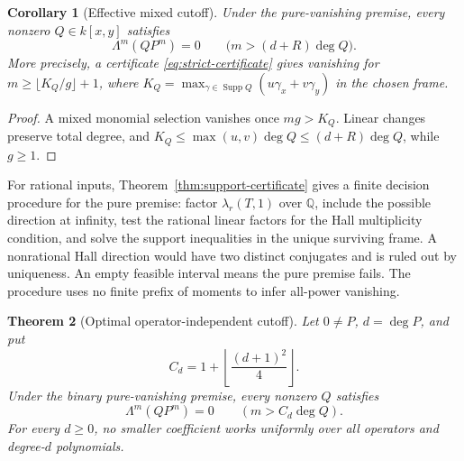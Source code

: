 \documentclass[11pt]{article}
\newtheorem{theorem}{Theorem}[section]
\newtheorem{corollary}[theorem]{Corollary}
\newcommand{\Q}{\mathbb Q}
\newcommand{\Supp}{\operatorname{Supp}}
\begin{document}
\begin{corollary}[Effective mixed cutoff]\label{cor:effective-cutoff}
Under the pure-vanishing premise, every nonzero $Q\in k[x,y]$ satisfies
\[
 \Lambda^m(QP^m)=0\qquad\bigl(m>(d+R)\deg Q\bigr).
\]
More precisely, a certificate \eqref{eq:strict-certificate} gives vanishing
for $m\geq\lfloor K_Q/g\rfloor+1$, where
$K_Q=\max_{\gamma\in\Supp Q}(u\gamma_x+v\gamma_y)$ in the chosen frame.
\end{corollary}

\begin{proof}
A mixed monomial selection vanishes once $mg>K_Q$.
Linear changes preserve total degree, and
$K_Q\leq\max(u,v)\deg Q\leq(d+R)\deg Q$, while $g\geq1$.
\end{proof}

For rational inputs, Theorem~\ref{thm:support-certificate} gives a finite
decision procedure for the pure premise: factor $\lambda_r(T,1)$ over
$\Q$, include the possible direction at infinity, test the rational
linear factors for the Hall multiplicity condition, and solve the support
inequalities in the unique surviving frame.  A nonrational Hall direction
would have two distinct conjugates and is ruled out by uniqueness.
An empty feasible interval means the pure premise fails.  The procedure
uses no finite prefix of moments to infer all-power vanishing.

\begin{theorem}[Optimal operator-independent cutoff]\label{thm:optimal-cutoff}
Let $0\ne P$, $d=\deg P$, and put
\[
 C_d=1+\left\lfloor\frac{(d+1)^2}{4}\right\rfloor.
\]
Under the binary pure-vanishing premise, every nonzero $Q$ satisfies
\[
 \Lambda^m(QP^m)=0\qquad(m>C_d\deg Q).
\]
For every $d\ge0$, no smaller coefficient works uniformly over all
operators and degree-$d$ polynomials.
\end{theorem}
\end{document}
